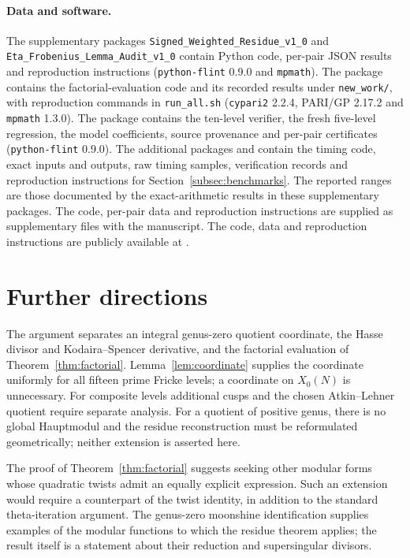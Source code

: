 \documentclass[11pt,a4paper]{article}
\numberwithin{equation}{section}
\theoremstyle{definition}
\theoremstyle{remark}
\newcommand{\DataRepositoryURL}{}
\begin{document}
\paragraph{Data and software.}
The supplementary packages \texttt{Signed\_Weighted\_Residue\_v1\_0} and
\texttt{Eta\_Frobenius\_Lemma\_Audit\_v1\_0} contain Python code, per-pair JSON
results and reproduction instructions (\texttt{python-flint} 0.9.0 and
\texttt{mpmath}). The package 
contains the factorial-evaluation code and its recorded results under
\texttt{new\_work/}, with reproduction commands in \texttt{run\_all.sh}
(\texttt{cypari2} 2.2.4, PARI/GP 2.17.2 and \texttt{mpmath} 1.3.0).
The package  contains the
ten-level verifier, the fresh five-level regression, the model coefficients,
source provenance and per-pair certificates (\texttt{python-flint} 0.9.0).
The additional packages  and
 contain the timing code,
exact inputs and outputs, raw timing samples, verification records and
reproduction instructions for Section~\ref{subsec:benchmarks}.
The reported ranges are those documented by the exact-arithmetic results
in these supplementary packages.
\if\relax\detokenize\expandafter{\DataRepositoryURL}\relax
The code, per-pair data and reproduction instructions are supplied as
supplementary files with the manuscript.
\else
The code, data and reproduction instructions are publicly available at
\expandafter\url\expandafter{\DataRepositoryURL}.
\fi

\section{Further directions}
The argument separates an integral genus-zero quotient coordinate, the
Hasse divisor and Kodaira--Spencer derivative, and the factorial
evaluation of Theorem~\ref{thm:factorial}.
Lemma~\ref{lem:coordinate} supplies the coordinate uniformly for all
fifteen prime Fricke levels; a coordinate on $X_0(N)$ is unnecessary.
For composite levels additional cusps and the chosen Atkin--Lehner
quotient require separate analysis. For a quotient of positive genus,
there is no global Hauptmodul and the residue reconstruction must be
reformulated geometrically; neither extension is asserted here.

The proof of Theorem~\ref{thm:factorial} suggests seeking other modular
forms whose quadratic twists admit an equally explicit expression.
Such an extension would require a counterpart of the twist identity,
in addition to the standard theta-iteration argument. The genus-zero
moonshine identification supplies examples of the modular functions
to which the residue theorem applies; the result itself is a statement
about their reduction and supersingular divisors.
\end{document}
